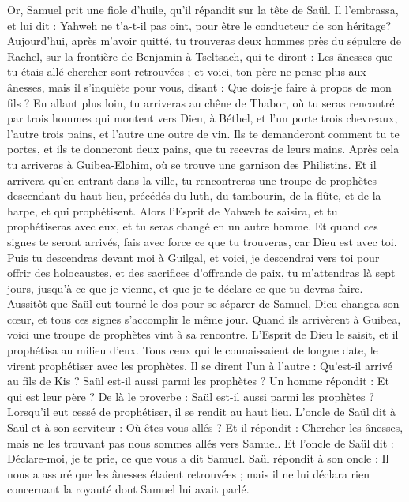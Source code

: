 \begin{multicols}{2}
\VerseOne{}Or, Samuel prit une fiole d'huile, qu’il répandit sur la tête de Saül. Il l’embrassa, et lui dit : Yahweh ne t'a-t-il pas oint, pour être le conducteur de son héritage?
Aujourd’hui, après m’avoir quitté, tu trouveras deux hommes près du sépulcre de Rachel, sur la frontière de Benjamin à Tseltsach, qui te diront : Les ânesses que tu étais allé chercher sont retrouvées ; et voici, ton père ne pense plus aux ânesses, mais il s’inquiète pour vous, disant : Que dois-je faire à propos de mon fils ?
En allant plus loin, tu arriveras au chêne de Thabor, où tu seras rencontré par trois hommes qui montent vers Dieu, à Béthel, et l'un porte trois chevreaux, l'autre trois pains, et l'autre une outre de vin.
Ils te demanderont comment tu te portes, et ils te donneront deux pains, que tu recevras de leurs mains.
Après cela tu arriveras à Guibea-Elohim, où se trouve une garnison des Philistins. Et il arrivera qu’en entrant dans la ville, tu rencontreras une troupe de prophètes descendant du haut lieu, précédés du luth, du tambourin, de la flûte, et de la harpe, et qui prophétisent.
Alors l'Esprit de Yahweh te saisira, et tu prophétiseras avec eux, et tu seras changé en un autre homme.
Et quand ces signes te seront arrivés, fais avec force ce que tu trouveras, car Dieu est avec toi.
Puis tu descendras devant moi à Guilgal, et voici, je descendrai vers toi pour offrir des holocaustes, et des sacrifices d’offrande de paix, tu m'attendras là sept jours, jusqu'à ce que je vienne, et que je te déclare ce que tu devras faire.
Aussitôt que Saül eut tourné le dos pour se séparer de Samuel, Dieu changea son cœur, et tous ces signes s’accomplir le même jour.
Quand ils arrivèrent à Guibea, voici une troupe de prophètes vint à sa rencontre. L'Esprit de Dieu le saisit, et il prophétisa au milieu d'eux.
Tous ceux qui le connaissaient de longue date, le virent prophétiser avec les prophètes. Il se dirent l'un à l'autre : Qu'est-il arrivé au fils de Kis ? Saül est-il aussi parmi les prophètes ?
Un homme répondit : Et qui est leur père ? De là le proverbe : Saül est-il aussi parmi les prophètes ?
Lorsqu’il eut cessé de prophétiser, il se rendit au haut lieu.
L'oncle de Saül dit à Saül et à son serviteur : Où êtes-vous allés ? Et il répondit : Chercher les ânesses, mais ne les trouvant pas nous sommes allés vers Samuel.
Et l’oncle de Saül dit : Déclare-moi, je te prie, ce que vous a dit Samuel.
Saül répondit à son oncle : Il nous a assuré que les ânesses étaient retrouvées ; mais il ne lui déclara rien concernant la royauté dont Samuel lui avait parlé.

\end{multicols}
